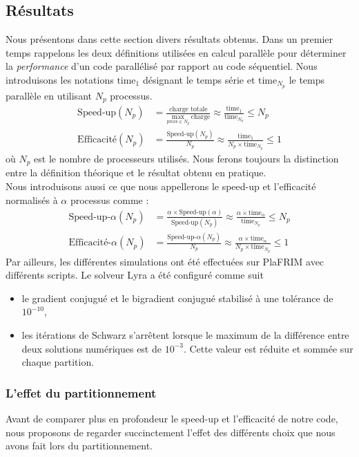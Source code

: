\documentclass[a4paper,11pt]{article}
\begin{document}
\subsection{Résultats}
\noindent Nous présentons dans cette section divers résultats obtenus. Dans un premier temps rappelons les deux définitions utilisées en calcul parallèle pour déterminer la \textit{performance} d'un code parallélisé par rapport au code séquentiel. Nous introduisons les notations $\text{time}_{1}$ désignant le temps série et $\text{time}_{N_p}$ le temps parallèle en utilisant $N_p$ processus.
\begin{align*}
	\text{Speed-up}\left(N_p\right) &= \frac{\text{charge totale}}{\underset{\text{procs}\in N_p}{\max} ~\text{charge}} \approx \frac{\text{time}_{1}}{\text{time}_{N_p}} \leq N_p\\
	\text{Efficacité}\left(N_p\right) &= \frac{\text{Speed-up}\left(N_p\right)}{N_p} \approx \frac{\text{time}_{1}}{N_p \times \text{time}_{N_p}} \leq 1
\end{align*}
où $N_p$ est le nombre de processeurs utilisés. Nous ferons toujours la distinction entre la définition théorique et le résultat obtenu en pratique.\\
Nous introduisons aussi ce que nous appellerons le speed-up et l'efficacité normalisés à $\alpha$ processus comme :
\begin{align*}
\text{Speed-up-}\alpha\left(N_p\right) &= \frac{\alpha\times \text{Speed-up} \left(\alpha\right)}{\text{Speed-up} \left(N_p\right)} \approx \frac{\alpha \times \text{time}_{\alpha}}{\text{time}_{N_p}} \leq N_p\\
\text{Efficacité-}\alpha\left(N_p\right) &= \frac{\text{Speed-up-}\alpha\left(N_p\right)}{N_p} \approx \frac{\alpha \times \text{time}_\alpha}{N_p \times \text{time}_{N_p}} \leq 1
\end{align*}
Par ailleurs, les différentes simulations ont été effectuées sur PlaFRIM avec différents scripts. Le solveur Lyra a été configuré comme suit
\begin{itemize}
	\item le gradient conjugué et le bigradient conjugué stabilisé à une tolérance de $10^{-10}$,
	\item les itérations de Schwarz s'arrêtent lorsque le maximum de la différence entre deux solutions numériques est de $10^{-3}$. Cette valeur est réduite et sommée sur chaque partition.
\end{itemize}
\subsubsection{L'effet du partitionnement}
\noindent Avant de comparer plus en profondeur le speed-up et l'efficacité de notre code, nous proposons de regarder succinctement l'effet des différents choix que nous avons fait lors du partitionnement.\\
\end{document}
